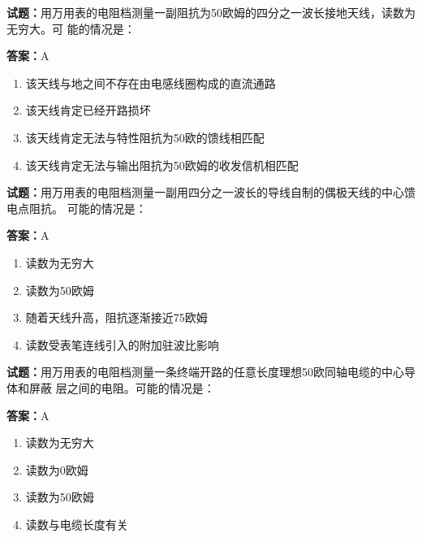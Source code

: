 \documentclass{ctexbook}
\begin{document}
\textbf{试题：}用万用表的电阻档测量一副阻抗为50欧姆的四分之一波长接地天线，读数为无穷大。可
能的情况是： 

\textbf{答案：}A 

\begin{enumerate}[leftmargin=3em]
  \item 该天线与地之间不存在由电感线圈构成的直流通路 

  \item 该天线肯定已经开路损坏 

  \item 该天线肯定无法与特性阻抗为50欧的馈线相匹配 

  \item 该天线肯定无法与输出阻抗为50欧姆的收发信机相匹配 

\end{enumerate}





\vspace{1em}

\textbf{试题：}用万用表的电阻档测量一副用四分之一波长的导线自制的偶极天线的中心馈电点阻抗。
可能的情况是： 

\textbf{答案：}A 


\begin{enumerate}[leftmargin=3em]
  \item 读数为无穷大 

  \item 读数为50欧姆 

  \item 随着天线升高，阻抗逐渐接近75欧姆 

  \item 读数受表笔连线引入的附加驻波比影响 

\end{enumerate}





\vspace{1em}

\textbf{试题：}用万用表的电阻档测量一条终端开路的任意长度理想50欧同轴电缆的中心导体和屏蔽
层之间的电阻。可能的情况是： 

\textbf{答案：}A 

\begin{enumerate}[leftmargin=3em]
  \item 读数为无穷大 

  \item 读数为0欧姆 

  \item 读数为50欧姆 

  \item 读数与电缆长度有关 

\end{enumerate}
\end{document}
